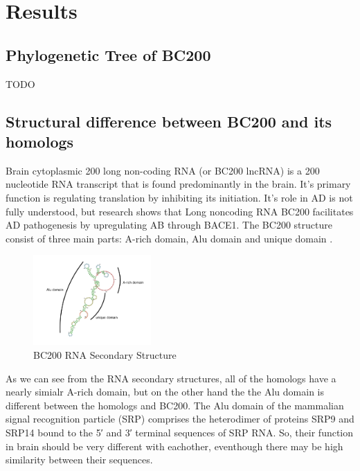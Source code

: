 \documentclass[conference]{IEEEtran}
\begin{document}
\section{Results}\label{sec:results}

\subsection{Phylogenetic Tree of BC200}
TODO

\subsection{Structural difference between BC200 and its homologs}

Brain cytoplasmic 200 long non-coding RNA (or BC200 lncRNA) is a 200 nucleotide RNA transcript that is found predominantly in the brain. It's primary function is regulating translation by inhibiting its initiation.
It's role in AD is not fully understood, but research shows that Long noncoding RNA BC200 facilitates AD pathogenesis by upregulating AB through BACE1.\cite{li2018identification}
The BC200 structure consist of three main parts: A-rich domain, Alu domain and unique domain \cite{jung2014rna}.
\begin{figure}
  \centering
  \includegraphics[width=0.4\textwidth]{figs/rna-6.png}
  \caption{BC200 RNA Secondary Structure}
\end{figure}
As we can see from the RNA secondary structures, all of the homologs have a nearly simialr A-rich domain, but on the other hand the the Alu domain is different between the homologs and BC200. The Alu domain of the mammalian signal recognition particle (SRP) comprises the heterodimer of proteins SRP9 and SRP14 bound to the 5′ and 3′ terminal sequences of SRP RNA\cite{weichenrieder2000structure}. So, their function in brain should be very different with eachother, eventhough there may be high similarity between their sequences.
\end{document}
